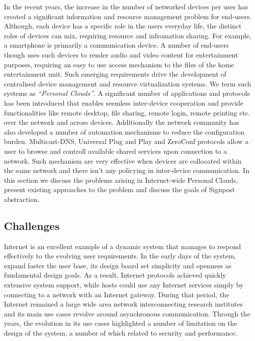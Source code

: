 In the recent years, the increase in the number of networked devices per user
has created a significant information and resource management problem for
end-users. Although, each device has a specific role in the users everyday life,
the distinct roles of devices can mix, requiring resource and infromation
sharing.  For example, a smartphone is primarily a communication device. A
number of end-users though uses such devices to render audio and video content
for entertainment purposes, requiring an easy to use access mechanism to the
files of the home entertainment unit.  Such emerging requirements drive the
development of centralised device management and resource virtualization
systems. We term such systems as {\it ``Personal Clouds''}. 
A significant number of applications and protocols has been introduced
that enables seemless inter-device cooperation and provide functionalities like
remote desktop, file sharing, remote login, remote printing etc. over the
network and across devices.  Additionally the network community has also
developed a number of automation mechanisms to reduce the configuration burden.
Multicast-DNS, Universal Plug and Play and ZeroConf protocols allow a user to
browse and controll available shared services upon connection to a network.
Such mechanism are very effective when devices are collocated within the same
network and there isn't any policying in inter-device communication.
In this section we discuss the problems arising in Internet-wide Personal Clouds,
present existing approaches to the problem and discuss the goals of
Signpost abstraction.



\subsection{Challenges}

Internet is an excellent example of a dynamic system that manages to respond
effectively to the evolving user requirements.  In the early days of the system,
expand faster the user base, its design board set simplicity and openness as
fundamental design goals.  As a result, Internet protocols achieved quickly
extensive system support, while hosts could use any Internet services simply by
connecting to a network with an Internet gateway. During that period, the
Internet remained a large wide area network interconnecting research institutes
and its main use cases revolve around asynchronous communication. Through the
years, the evolution in its use cases highlighted a number of limitation on the
design of the system, a number of which related to security and performance.

